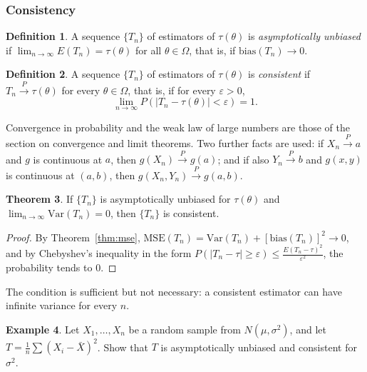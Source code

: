 \documentclass[12pt,a4paper]{report}
\theoremstyle{definition}
\newtheorem{thm}{Theorem}[section]
\newtheorem{definition}[thm]{Definition}
\newtheorem{example}[thm]{Example}
\theoremstyle{plain}
\begin{document}
\subsubsection{Consistency}
\label{sec:consistency}

\begin{definition}
\label{def:asymptunbiased}
A sequence $\{T_n\}$ of estimators of $\tau(\theta)$ is \emph{asymptotically
unbiased} if $\lim_{n\to \infty} E(T_n) = \tau(\theta)$ for all
$\theta \in \Omega$, that is, if $\text{bias}(T_n)\to 0$.
\end{definition}

\begin{definition}
\label{def:consistent}
A sequence $\{T_n\}$ of estimators of $\tau(\theta)$ is \emph{consistent} if
$T_n\overset{P}{\longrightarrow}\tau(\theta)$ for every $\theta \in \Omega$, that is,
if for every $\varepsilon > 0$,
\[\lim_{n\to \infty}P\left(|T_n - \tau(\theta)| < \varepsilon\right) = 1 .\]
\end{definition}

Convergence in probability and the weak law of large numbers are those of the
section on convergence and limit theorems. Two further facts are used: if
$X_n\overset{P}{\longrightarrow} a$ and $g$ is continuous at $a$, then
$g(X_n)\overset{P}{\longrightarrow} g(a)$; and if also
$Y_n\overset{P}{\longrightarrow} b$ and $g(x,y)$ is continuous at $(a,b)$, then
$g(X_n,Y_n)\overset{P}{\longrightarrow} g(a,b)$.

\begin{thm}
\label{thm:mseconsistency}
If $\{T_n\}$ is asymptotically unbiased for $\tau(\theta)$ and
$\lim_{n\to\infty}\text{Var}(T_n) = 0$, then $\{T_n\}$ is consistent.
\end{thm}

\begin{proof}
By Theorem~\ref{thm:mse}, $\text{MSE}(T_n) = \text{Var}(T_n) +
[\text{bias}(T_n)]^2\to 0$, and by Chebyshev's inequality in the form
$P(|T_n - \tau|\geq\varepsilon)\leq\frac{E(T_n - \tau)^2}{\varepsilon^2}$, the
probability tends to $0$.
\end{proof}

The condition is sufficient but not necessary: a consistent estimator can have
infinite variance for every $n$.

\begin{example}
\label{ex:consistentvariance}
Let $X_1, \dots, X_n$ be a random sample from $N(\mu,\sigma^2)$, and let
$T = \frac{1}{n}\sum(X_i - \bar{X})^2$. Show that $T$ is asymptotically unbiased
and consistent for $\sigma^2$.
\end{example}
\end{document}
